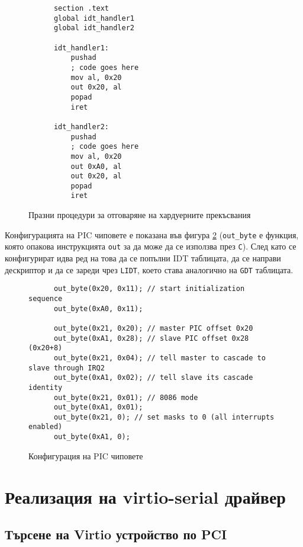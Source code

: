   \begin{figure}[ht]
    \centering
    \begin{verbatim}
      section .text
      global idt_handler1
      global idt_handler2

      idt_handler1:
          pushad
          ; code goes here
          mov al, 0x20
          out 0x20, al
          popad
          iret

      idt_handler2:
          pushad
          ; code goes here
          mov al, 0x20
          out 0xA0, al
          out 0x20, al
          popad
          iret
    \end{verbatim}
    \caption{Празни процедури за отговаряне на хардуерните прекъсвания}
    \label{fig:irqhandlers}
  \end{figure}

  Конфигурацията на PIC чиповете е показана във фигура \ref{fig:picconfig} ({\tt out\_byte} е функция, която опакова инструкцията {\tt out} за да може да се използва през {\tt C}). След като се конфигурират идва ред на това да се попълни IDT таблицата, да се направи дескриптор и да се зареди чрез {\tt LIDT}, което става аналогично на {\tt GDT} таблицата.

  \begin{figure}[ht]
    \centering
    \begin{verbatim}
      out_byte(0x20, 0x11); // start initialization sequence
      out_byte(0xA0, 0x11);

      out_byte(0x21, 0x20); // master PIC offset 0x20
      out_byte(0xA1, 0x28); // slave PIC offset 0x28 (0x20+8)
      out_byte(0x21, 0x04); // tell master to cascade to slave through IRQ2
      out_byte(0xA1, 0x02); // tell slave its cascade identity
      out_byte(0x21, 0x01); // 8086 mode
      out_byte(0xA1, 0x01);
      out_byte(0x21, 0); // set masks to 0 (all interrupts enabled)
      out_byte(0xA1, 0);
    \end{verbatim}
    \caption{Конфигурация на PIC чиповете}
    \label{fig:picconfig}
  \end{figure}

\section{Реализация на virtio-serial драйвер}
  \subsection{Търсене на Virtio устройство по PCI}

